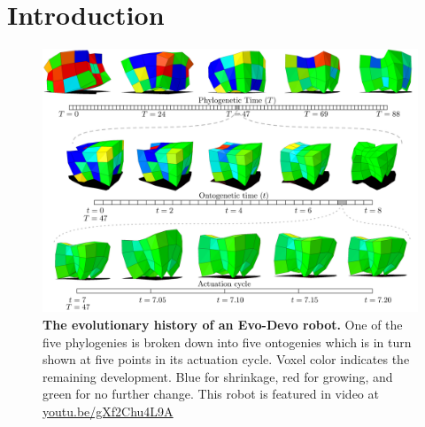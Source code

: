 \section{Introduction}
\label{sec3:introduction}

\begin{figure}[t]
\includegraphics[width=1\textwidth]{Chapter03/img/softbot6000}
\caption{\label{fig:videos}   \textbf{The evolutionary history of an Evo-Devo robot.} One of the five phylogenies is broken down into five ontogenies which is in turn shown at five points in its actuation cycle. Voxel color indicates the remaining development. Blue for shrinkage, red for growing, and green for no further change. This robot is featured in video at \href{https://youtu.be/gXf2Chu4L9A}{\color{blue}youtu.be/gXf2Chu4L9A}
}
\end{figure}






